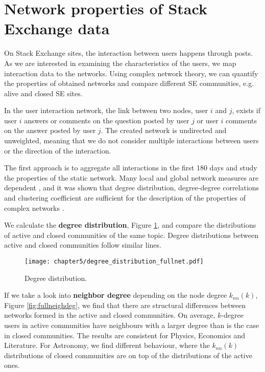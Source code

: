 \section{Network properties of Stack Exchange data}

On Stack Exchange sites, the interaction between users happens through posts. As we are interested in examining the characteristics of the users, we map interaction data to the networks. Using complex network theory, we can quantify the properties of obtained networks and compare different SE communities, e.g. alive and closed SE sites. 

In the user interaction network, the link between two nodes, user $i$ and $j$, exists if user $i$ answers or comments on the question posted by user $j$ or user $i$ comments on the answer posted by user $j$. The created network is undirected and unweighted, meaning that we do not consider multiple interactions between users or the direction of the interaction. 

The first approach is to aggregate all interactions in the first 180 days and study the properties of the static network. Many local and global network measures are dependent 
\cite{boccaletti2006complex}, and it was shown that degree distribution, degree-degree correlations and clustering coefficient are sufficient for the description of the properties of complex networks \cite{orsini2015quantifying}. 

We calculate the \textbf{degree distribution}, Figure \ref{fig:fullnetdeg}, and compare the distributions of active and closed communities of the same topic. Degree distributions between active and closed communities follow similar lines. 

\begin{figure}[ht]
	\centering
	\texttt{[image: chapter5/degree\_distribution\_fullnet.pdf]}
	\caption{Degree distribution.}
	\label{fig:fullnetdeg}
\end{figure}

If we take a look into \textbf{neighbor degree} depending on the node degree $k_{nn}(k)$, Figure \ref{fig:fullneighdeg}, we find that there are structural differences between networks formed in the active and closed communities. On average, $k$-degree users in active communities have neighbours with a larger degree than is the case in closed communities. The results are consistent for Physics, Economics and Literature. For Astronomy, we find different behaviour, where the $k_{nn}(k)$ distributions of closed communities are on top of the distributions of the active ones. 

